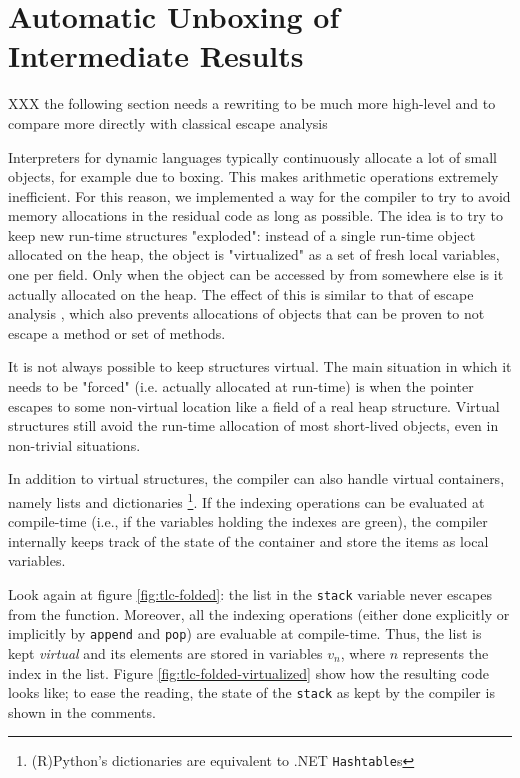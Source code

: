 \section{Automatic Unboxing of Intermediate Results}
\label{sec:virtuals}

XXX the following section needs a rewriting to be much more high-level and to
compare more directly with classical escape analysis


Interpreters for dynamic languages typically continuously allocate a lot of small
objects, for example due to boxing. This makes arithmetic operations extremely
inefficient. For this reason, we
implemented a way for the compiler to try to avoid memory allocations in the
residual code as long as possible. The idea is to try to keep new
run-time structures "exploded": instead of a single run-time object allocated on
the heap, the object is "virtualized" as a set
of fresh local variables, one per field. Only when the object can be accessed by from
somewhere else is it actually allocated on the heap. The effect of this is similar to that of
escape analysis \cite{XXX}, which also prevents allocations of objects that can
be proven to not escape a method or set of methods.

It is not always possible to keep structures virtual.  The main
situation in which it needs to be "forced" (i.e. actually allocated at
run-time) is when the pointer escapes to some non-virtual location like
a field of a real heap structure.  Virtual structures still avoid the run-time
 allocation of most short-lived objects, even in non-trivial situations.  

In addition to virtual structures, the compiler can also handle virtual
containers, namely lists and dictionaries \footnote{(R)Python's dictionaries
  are equivalent to .NET \lstinline{Hashtable}s}.  If the indexing operations
can be evaluated at compile-time (i.e., if the variables holding the indexes
are green), the compiler internally keeps track of the state of the container
and store the items as local variables.

Look again at figure \ref{fig:tlc-folded}: the list in the \lstinline{stack}
variable never escapes from the function.  Moreover, all the indexing
operations (either done explicitly or implicitly by \lstinline{append} and
\lstinline{pop}) are evaluable at compile-time.  Thus, the list is kept
\emph{virtual} and its elements are stored in variables $v_n$, where $n$
represents the index in the list.  Figure \ref{fig:tlc-folded-virtualized}
show how the resulting code looks like; to ease the reading, the state of the
\lstinline{stack} as kept by the compiler is shown in the comments.

